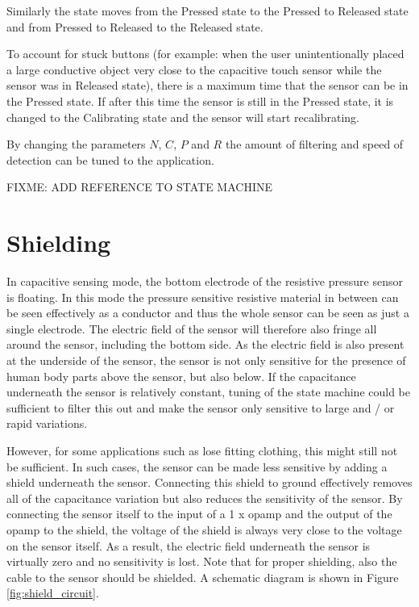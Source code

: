 \documentclass{sigchi}
\begin{document}
Similarly the state moves from the Pressed state to the Pressed to Released
state and from Pressed to Released to the Released state.

To account for stuck buttons (for example: when the user unintentionally placed
a large conductive object very close to the capacitive touch sensor while the
sensor was in Released state), there is a maximum time that the sensor can be in
the Pressed state. If after this time the sensor is still in the Pressed state,
it is changed to the Calibrating state and the sensor will start recalibrating.

By changing the parameters $N$, $C$, $P$ and $R$ the amount of filtering and
speed of detection can be tuned to the application.

FIXME: ADD REFERENCE TO STATE MACHINE 

\section{Shielding}
In capacitive sensing mode, the bottom electrode of the resistive pressure
sensor is floating. In this mode the pressure sensitive resistive material in
between can be seen effectively as a conductor and thus the whole sensor can be
seen as just a single electrode. The electric field of the sensor will therefore
also fringe all around the sensor, including the bottom side. As the electric
field is also present at the underside of the sensor, the sensor is not only
sensitive for the presence of human body parts above the sensor, but also below.
If the capacitance underneath the sensor is relatively constant, tuning of the
state machine could be sufficient to filter this out and make the sensor only
sensitive to large and / or rapid variations.

However, for some applications such as lose fitting clothing, this might still
not be sufficient. In such cases, the sensor can be made less sensitive by
adding a shield underneath the sensor. Connecting this shield to ground
effectively removes all of the capacitance variation but also reduces the
sensitivity of the sensor. By connecting the sensor itself to the input of a 1 x
opamp and the output of the opamp to the shield, the voltage of the shield is
always very close to the voltage on the sensor itself. As a result, the electric
field underneath the sensor is virtually zero and no sensitivity is lost. Note
that for proper shielding, also the cable to the sensor should be shielded. A
schematic diagram is shown in Figure \ref{fig:shield_circuit}.
\end{document}
